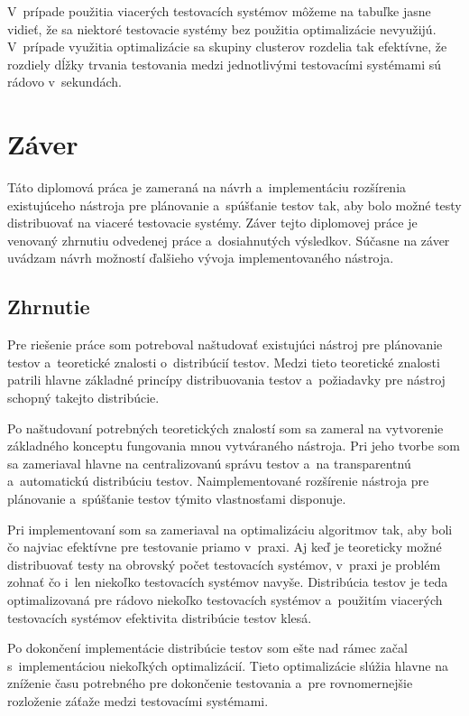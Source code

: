 V~prípade použitia viacerých testovacích systémov môžeme na tabuľke jasne vidieť,
že sa niektoré testovacie systémy bez použitia optimalizácie nevyužijú. 
V~prípade využitia optimalizácie sa skupiny clusterov rozdelia tak efektívne,
že rozdiely dĺžky trvania testovania medzi jednotlivými testovacími systémami 
sú rádovo v~sekundách.


%
%
\chapter{Záver}
\label{kapitola:zaver}
Táto diplomová práca je zameraná na návrh a~implementáciu rozšírenia
existujúceho nástroja pre plánovanie a~spúšťanie testov tak, aby bolo
možné testy distribuovať na viaceré testovacie systémy. 
Záver tejto diplomovej práce je venovaný zhrnutiu odvedenej práce 
a~dosiahnutých výsledkov. Súčasne na záver uvádzam návrh možností ďalšieho
vývoja implementovaného nástroja.

\section{Zhrnutie}
\label{sekcia:zhrnutie}
Pre riešenie práce som potreboval naštudovať existujúci nástroj pre 
plánovanie testov a~teoretické znalosti o~distribúcií testov.
Medzi tieto teoretické znalosti patrili hlavne základné princípy 
distribuovania testov a~požiadavky pre nástroj schopný takejto distribúcie.

Po naštudovaní potrebných teoretických znalostí som sa zameral na vytvorenie
základného konceptu fungovania mnou vytváraného nástroja. Pri jeho tvorbe
som sa zameriaval hlavne na centralizovanú správu testov a~na transparentnú
a~automatickú distribúciu testov. Naimplementované rozšírenie nástroja pre
plánovanie a~spúšťanie testov týmito vlastnosťami disponuje.

Pri implementovaní som sa zameriaval na optimalizáciu algoritmov tak, aby
boli čo najviac efektívne pre testovanie priamo v~praxi. 
Aj keď je teoreticky možné distribuovať testy na obrovský počet
testovacích systémov, v~praxi je problém zohnať čo i~len niekoľko testovacích
systémov navyše. 
Distribúcia testov je teda optimalizovaná pre rádovo niekoľko testovacích 
systémov a~použitím viacerých testovacích systémov efektivita distribúcie
testov klesá. 

Po dokončení implementácie distribúcie testov som ešte nad rámec začal 
s~implementáciou niekoľkých optimalizácií. Tieto optimalizácie slúžia hlavne
na zníženie času potrebného pre dokončenie testovania a~pre rovnomernejšie
rozloženie záťaže medzi testovacími systémami. 

